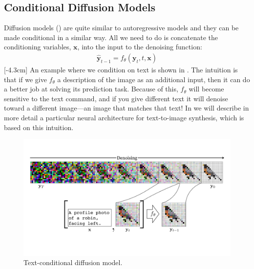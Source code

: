 \subsection{Conditional Diffusion Models}\label{sec:conditional_generative_models:conditional_diffusion_model}
Diffusion models (\sect{\ref{sec:generative_models:diffusion_models}}) are quite similar to autoregressive models and they can be made conditional in a similar way. All we need to do is concatenate the conditioning variables, $\mathbf{x}$, into the input to the denoising function:
\begin{align}
    \hat{\mathbf{y}}_{t-1} = f_{\theta}(\mathbf{y}_t, t, \mathbf{x})
\end{align}
[-4.3cm]
An example where we condition on text is shown in \fig{\ref{fig:conditional_generative_models:text_conditional_diffusion_model}}.
The intuition is that if we give $f_{\theta}$ a description of the image as an additional input, then it can do a better job at solving its prediction task. Because of this, $f_{\theta}$ will become sensitive to the text command, and if you give different text it will denoise toward a different image—an image that matches that text! In \chap{\ref{chapter:VLMs}} we will describe in more detail a particular neural architecture for text-to-image synthesis, which is based on this intuition.
\begin{figure}[h!]
    \centerline{
        \includegraphics[width=1.0\linewidth]{./figures/conditional_generative_models/text_conditional_diffusion_model.pdf}
    }
    \caption{Text-conditional diffusion model.}
    \label{fig:conditional_generative_models:text_conditional_diffusion_model}
\end{figure}

